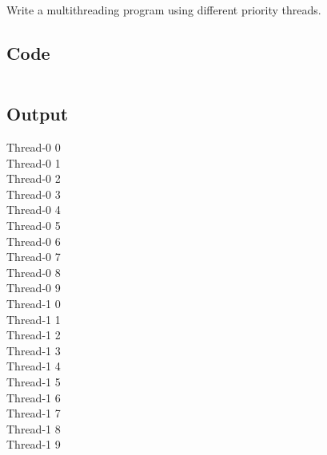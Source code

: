 \documentclass[../main.tex]{subfiles}
\begin{document}
Write a multithreading program using different priority threads.

\subsection{Code}
\inputminted[frame=lines, breaklines, breakanywhere, numberblanklines=false]{java}{./programs/prog21/Threading.java}

\subsection{Output}
Thread-0 0 \\
Thread-0 1 \\
Thread-0 2 \\
Thread-0 3 \\
Thread-0 4 \\
Thread-0 5 \\
Thread-0 6 \\
Thread-0 7 \\
Thread-0 8 \\
Thread-0 9 \\
Thread-1 0 \\
Thread-1 1 \\
Thread-1 2 \\
Thread-1 3 \\
Thread-1 4 \\
Thread-1 5 \\
Thread-1 6 \\
Thread-1 7 \\
Thread-1 8 \\
Thread-1 9 \\
\end{document}
